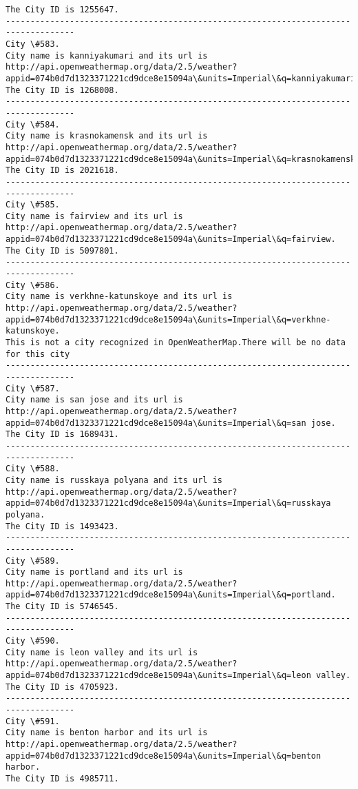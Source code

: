 \documentclass[11pt]{article}
\begin{document}
\begin{Verbatim}[commandchars=\\\{\}]
The City ID is 1255647.
------------------------------------------------------------------------------------
City \#583.
City name is kanniyakumari and its url is http://api.openweathermap.org/data/2.5/weather?appid=074b0d7d1323371221cd9dce8e15094a\&units=Imperial\&q=kanniyakumari.
The City ID is 1268008.
------------------------------------------------------------------------------------
City \#584.
City name is krasnokamensk and its url is http://api.openweathermap.org/data/2.5/weather?appid=074b0d7d1323371221cd9dce8e15094a\&units=Imperial\&q=krasnokamensk.
The City ID is 2021618.
------------------------------------------------------------------------------------
City \#585.
City name is fairview and its url is http://api.openweathermap.org/data/2.5/weather?appid=074b0d7d1323371221cd9dce8e15094a\&units=Imperial\&q=fairview.
The City ID is 5097801.
------------------------------------------------------------------------------------
City \#586.
City name is verkhne-katunskoye and its url is http://api.openweathermap.org/data/2.5/weather?appid=074b0d7d1323371221cd9dce8e15094a\&units=Imperial\&q=verkhne-katunskoye.
This is not a city recognized in OpenWeatherMap.There will be no data for this city
------------------------------------------------------------------------------------
City \#587.
City name is san jose and its url is http://api.openweathermap.org/data/2.5/weather?appid=074b0d7d1323371221cd9dce8e15094a\&units=Imperial\&q=san jose.
The City ID is 1689431.
------------------------------------------------------------------------------------
City \#588.
City name is russkaya polyana and its url is http://api.openweathermap.org/data/2.5/weather?appid=074b0d7d1323371221cd9dce8e15094a\&units=Imperial\&q=russkaya polyana.
The City ID is 1493423.
------------------------------------------------------------------------------------
City \#589.
City name is portland and its url is http://api.openweathermap.org/data/2.5/weather?appid=074b0d7d1323371221cd9dce8e15094a\&units=Imperial\&q=portland.
The City ID is 5746545.
------------------------------------------------------------------------------------
City \#590.
City name is leon valley and its url is http://api.openweathermap.org/data/2.5/weather?appid=074b0d7d1323371221cd9dce8e15094a\&units=Imperial\&q=leon valley.
The City ID is 4705923.
------------------------------------------------------------------------------------
City \#591.
City name is benton harbor and its url is http://api.openweathermap.org/data/2.5/weather?appid=074b0d7d1323371221cd9dce8e15094a\&units=Imperial\&q=benton harbor.
The City ID is 4985711.

\end{Verbatim}
\end{document}
